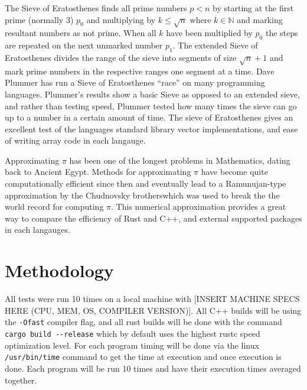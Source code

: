 \documentclass[10pt]{IEEEtran}
\begin{document}
\par
The Sieve of Eratosthenes finds all prime numbers $p<n$ by starting at the first prime (normally 3) $p_0$ and multiplying by $k \leq \sqrt{n}$ where $k \in \mathbb{N}$ and marking resultant numbers as not prime.
When all $k$ have been multiplied by $p_0$ the steps are repeated on the next unmarked number $p_1$.
The extended Sieve of Eratosthenes divides the range of the sieve into segments of size $\sqrt{n}+1$ and mark prime numbers in the respective ranges one segment at a time.
Dave Plummer has run a Sieve of Eratosthenes “race” on many programming languages\cite{plummer}. 
Plummer's results show a basic Sieve as opposed to an extended sieve, and rather than testing speed, Plummer tested how many times 
the sieve can go up to a number in a certain amount of time. 
The sieve of Eratosthenes gives an excellent test of the languages standard library vector implementations, and ease of writing array code in each langauge.
\par
Approximating $\pi$ has been one of the longest problems in Mathematics, dating back to Ancient Egypt\cite{burton}. Methods for approximating $\pi$ have become quite computationally efficient since then and eventually 
lead to a Ramunujan-type approximation by the Chudnovsky brotherswhich was used to break the the world record for computing $\pi$\cite{lynn}.
This numerical approximation provides a great way to compare the efficiency of Rust and C++, and external supported packages in each langauges.

\section{Methodology}
All tests were run 10 times on a local machine with [INSERT MACHINE SPECS HERE (CPU, MEM, OS, COMPILER VERSION)]. All C++ builds will be using the \verb|-Ofast| 
compiler flag, and all rust builds will be done with the command \verb|cargo build --release| which by default 
uses the highest rustc speed optimization level\cite{cargobook}. For each program timing will be done via the linux \verb|/usr/bin/time| command to get the time at execution and once execution is done.
Each program will be run 10 times and have their execution times averaged together.
\end{document}
